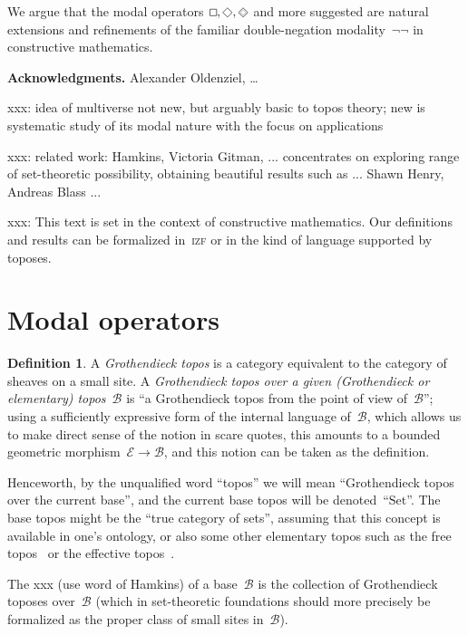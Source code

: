\documentclass[oneside,reqno]{amsart}
\theoremstyle{definition}
\newtheorem{defn}{Definition}[section]
\theoremstyle{plain}
\theoremstyle{remark}
\newcommand{\E}{\mathcal{E}}
\newcommand{\B}{\mathcal{B}}
\newcommand{\Set}{\mathrm{Set}}
\renewcommand{\_}{\mathpunct{.}\,}
\DeclareMathOperator{\possible}{\text{\tikz[scale=.6ex/1cm,baseline=-.6ex,rotate=45,line width=.1ex]{\draw (-1,-1) rectangle (1,1);}}}
\DeclareMathOperator{\necessary}{\text{\tikz[scale=.6ex/1cm,baseline=-.6ex,line width=.1ex]{\draw (-1,-1) rectangle (1,1);}}}
\DeclareMathOperator{\xpossible}{\text{\tikz[scale=.6ex/1cm,baseline=-.6ex,rotate=45,line width=.1ex]{\draw (-1,-1) rectangle (1,1); \draw[very thin] (-.6,-.6) rectangle (.6,.6);}}}
\newcommand{\?}{\,{:}\,}
\begin{document}
We argue that the modal operators~$\necessary,\possible,\xpossible$ and more
suggested are natural extensions and refinements of the
familiar double-negation modality~$\neg\neg$ in constructive mathematics.

\textbf{Acknowledgments.} Alexander Oldenziel, \ldots

xxx: idea of multiverse not new, but arguably basic to topos theory; new is systematic
study of its modal nature with the focus on applications

xxx: related work: Hamkins, Victoria Gitman, ... concentrates on exploring
range of set-theoretic possibility, obtaining beautiful results such as ...
Shawn Henry, Andreas Blass ...

xxx: This text is set in the context of constructive mathematics.
Our definitions and results can be formalized in~\textsc{izf} or in the
kind of language supported by toposes.

\section{Modal operators}
\label{sect:defn-modalities}

\begin{defn}A \emph{Grothendieck topos} is a category equivalent to
the category of sheaves on a small site. A \emph{Grothendieck topos over a
given (Grothendieck or elementary) topos}~$\B$ is ``a Grothendieck topos from
the point of view of~$\B$''; using a sufficiently expressive form of the
internal language of~$\B$, which allows us to make direct sense of the notion in
scare quotes, this amounts to a bounded geometric morphism~$\E \to
\B$, and this notion can be taken as the definition.
\end{defn}

Henceworth, by the unqualified word ``topos'' we will mean ``Grothendieck topos
over the current base'', and the current base topos will be denoted~``$\Set$''.
The base topos might be the ``true category of sets'', assuming that this
concept is available in one's ontology, or also some other elementary topos
such as the free topos~\cite{xxx} or the ef{}fective topos~\cite{xxx}.

The xxx (use word of Hamkins) of a base~$\B$ is the collection of Grothendieck
toposes over~$\B$ (which in set-theoretic foundations should more precisely be
formalized as the proper class of small sites in~$\B$).
\end{document}

